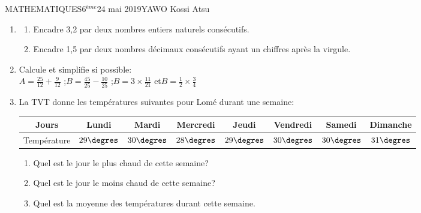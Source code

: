 \documentclass[12pt,a4paper]{book}
\newcommand{\prof}{YAWO Kossi Atsu}
\newcommand{\matiere}{MATHEMATIQUES}
\newcommand{\classe}{6$^{ème}$}
\begin{document}
\begin{td}{\matiere}{\classe}{24 mai 2019}{\prof}
\begin{exo}
\begin{enumerate}
\item \begin{enumerate}
\item Encadre 3,2 par deux nombres entiers naturels consécutifs.
\item Encadre 1,5 par deux nombres décimaux consécutifs ayant un chiffres après la virgule.
\end{enumerate}
\item Calcule et simplifie si possible:\\
$A=\frac{25}{12}+\frac{9}{12}$ \qquad ;\qquad $B=\frac{45}{25}-\frac{10}{25}$ \qquad ;\qquad $B=3 \times\frac{11}{21}$ \qquad et\qquad $B=\frac{1}{2} \times \frac{3}{4}$
\item La TVT donne les températures suivantes pour Lomé durant une semaine:
\begin{tabular}{|c|c|c|c|c|c|c|c|}
\hline 
Jours & Lundi & Mardi & Mercredi & Jeudi & Vendredi & Samedi & Dimanche \\ 
\hline 
Température & $29\degres$ & $30\degres$ & $28\degres$ & $29\degres$ & $30\degres$ & $30\degres$ & $31\degres$ \\ 
\hline 
\end{tabular} 
\begin{enumerate}
\item Quel est le jour le plus chaud de cette semaine?
\item Quel est le jour le moins chaud de cette semaine?
\item Quel est la moyenne des températures durant cette semaine.
\end{enumerate}
\end{enumerate}
\end{exo}
\end{td}
\end{document}
